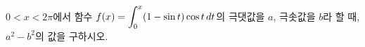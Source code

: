 \hspace*{2mm}\begin{minipage}[t]{\dimexpr\linewidth-2mm\relax}\vspace{0pt}
$0<x<2\pi$에서 함수 $f(x)=\displaystyle\int_{0}^{x}(1-\sin t)\cos t\mkern3mu dt$의 극댓값을 $a$, 극솟값을 $b$라 할 때, $a^2-b^2$의 값을 구하시오.\end{minipage}
